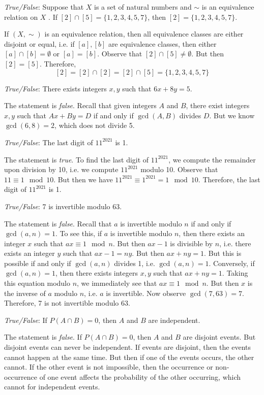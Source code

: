\documentclass[11pt,letterpaper]{article}
\begin{document}
\quizsol \textit{True/False}: Suppose that $X$ is a set of natural numbers and $\sim$ is an equivalence relation on $X$ . If $[2] \cap [5]= \{ 1, 2, 3, 4, 5, 7 \}$, then $[2]= \{ 1, 2, 3, 4, 5, 7 \}$. \pspace

\sol If $(X, \sim)$ is an equivalence relation, then all equivalence classes are either disjoint or equal, i.e. if $[a], [b]$ are equivalence classes, then either $[a] \cap [b]= \emptyset$ or $[a]= [b]$. Observe that $[2] \cap [5] \neq \emptyset$. But then $[2]= [5]$. Therefore, 
	\[
	[2]= [2] \cap [2]= [2] \cap [5]= \{ 1, 2, 3, 4, 5, 7 \}
	\] \pvspace{1.5cm}



\newpage



\quizsol \textit{True/False}: There exists integers $x, y$ such that $6x + 8y= 5$. \pspace

\sol The statement is \textit{false}. Recall that given integers $A$ and $B$, there exist integers $x, y$ such that $Ax + By= D$ if and only if $\gcd(A, B)$ divides $D$. But we know $\gcd(6, 8)= 2$, which does not divide 5. \pvspace{1.5cm}



\quizsol \textit{True/False}: The last digit of $11^{2021}$ is 1. \pspace

\sol The statement is \textit{true}. To find the last digit of $11^{2021}$, we compute the remainder upon division by 10, i.e. we compute $11^{2021}$ modulo 10. Observe that $11 \equiv 1 \mod 10$. But then we have $11^{2021} \equiv 1^{2021}= 1 \mod 10$. Therefore, the last digit of $11^{2021}$ is 1. \pvspace{1.5cm}



\quizsol \textit{True/False}: 7 is invertible modulo 63. \pspace

\sol The statement is \textit{false}. Recall that $a$ is invertible modulo $n$ if and only if $\gcd(a, n)= 1$. To see this, if $a$ is invertible modulo $n$, then there exists an integer $x$ such that $ax \equiv 1 \mod n$. But then $ax - 1$ is divisible by $n$, i.e. there exists an integer $y$ such that $ax - 1= ny$. But then $ax + ny= 1$. But this is possible if and only if $\gcd(a, n)$ divides 1, i.e. $\gcd(a, n)= 1$. Conversely, if $\gcd(a, n)= 1$, then there exists integers $x, y$ such that $ax + ny= 1$. Taking this equation modulo $n$, we immediately see that $ax \equiv 1 \mod n$. But then $x$ is the inverse of $a$ modulo $n$, i.e. $a$ is invertible. Now observe $\gcd(7, 63)= 7$. Therefore, 7 is not invertible modulo 63. \pvspace{1.5cm}



\quizsol \textit{True/False}: If $P(A \cap B)= 0$, then $A$ and $B$ are independent. \pspace

\sol The statement is \textit{false}. If $P(A \cap B)= 0$, then $A$ and $B$ are disjoint events. But disjoint events can never be independent. If events are disjoint, then the events cannot happen at the same time. But then if one of the events occurs, the other cannot. If the other event is not impossible, then the occurrence or non-occurrence of one event affects the probability of the other occurring, which cannot for independent events.
\end{document}
